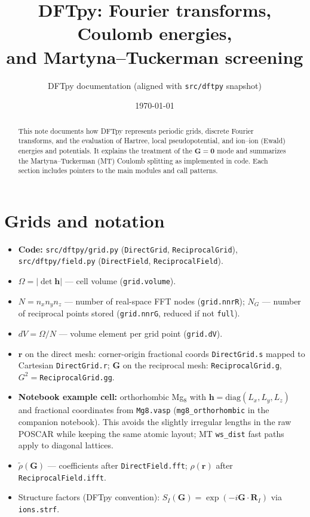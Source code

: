 \documentclass[11pt,a4paper]{article}
\title{DFTpy: Fourier transforms, Coulomb energies,\\
and Martyna--Tuckerman screening}
\author{DFTpy documentation (aligned with \texttt{src/dftpy} snapshot)}
\date{\today}
\begin{document}
\maketitle

\begin{abstract}
This note documents how DFTpy represents periodic grids, discrete Fourier transforms,
and the evaluation of Hartree, local pseudopotential, and ion--ion (Ewald) energies and
potentials. It explains the treatment of the $\mathbf G=\mathbf 0$ mode and summarizes
the Martyna--Tuckerman (MT) Coulomb splitting as implemented in code.
Each section includes pointers to the main modules and call patterns.
\end{abstract}

\tableofcontents
\newpage

\section{Grids and notation}

\begin{itemize}
  \item \textbf{Code:} \texttt{src/dftpy/grid.py} (\texttt{DirectGrid}, \texttt{ReciprocalGrid}),
        \texttt{src/dftpy/field.py} (\texttt{DirectField}, \texttt{ReciprocalField}).
  \item $\Omega = |\det\mathbf h|$ --- cell volume (\texttt{grid.volume}).
  \item $N = n_x n_y n_z$ --- number of real-space FFT nodes (\texttt{grid.nnrR});
        $N_G$ --- number of reciprocal points stored (\texttt{grid.nnrG}, reduced if not \texttt{full}).
  \item $dV = \Omega/N$ --- volume element per grid point (\texttt{grid.dV}).
  \item $\mathbf r$ on the direct mesh: corner-origin fractional coords \texttt{DirectGrid.s}
        mapped to Cartesian \texttt{DirectGrid.r}; $\mathbf G$ on the reciprocal mesh:
        \texttt{ReciprocalGrid.g}, $G^2=$\texttt{ReciprocalGrid.gg}.
  \item \textbf{Notebook example cell:} orthorhombic Mg$_8$ with
        $\mathbf h=\mathrm{diag}(L_x,L_y,L_z)$ and fractional coordinates from
        \texttt{Mg8.vasp} (\texttt{mg8\_orthorhombic} in the companion notebook).
        This avoids the slightly irregular lengths in the raw POSCAR while keeping
        the same atomic layout; MT \texttt{ws\_dist} fast paths apply to diagonal lattices.
  \item $\tilde\rho(\mathbf G)$ --- coefficients after \texttt{DirectField.fft}; $\rho(\mathbf r)$
        after \texttt{ReciprocalField.ifft}.
  \item Structure factors (DFTpy convention):
        $S_I(\mathbf G)=\exp(-i\mathbf G\cdot\mathbf R_I)$ via \texttt{ions.strf}.
\end{itemize}
\end{document}
